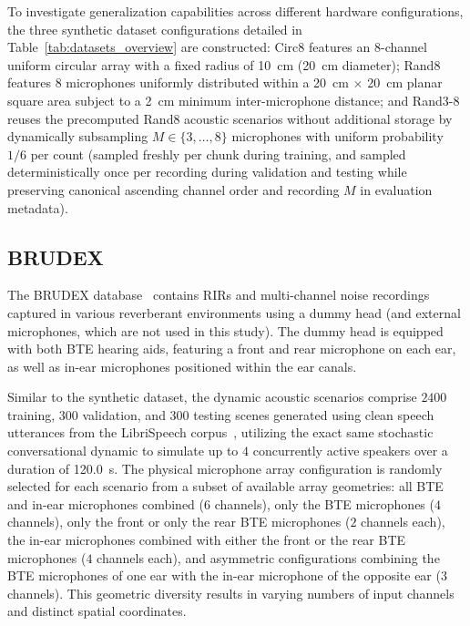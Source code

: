 \documentclass[lettersize,journal]{IEEEtran}
\begin{document}
To investigate generalization capabilities across different hardware configurations,
the three synthetic dataset configurations detailed in Table~\ref{tab:datasets_overview} are constructed:
Circ8 features an $8$-channel uniform circular array with a fixed radius of \SI{10}{\centi\meter} (\SI{20}{\centi\meter} diameter);
Rand8 features $8$ microphones uniformly distributed within a \SI{20}{\centi\meter} $\times$ \SI{20}{\centi\meter} planar square area subject to a \SI{2}{\centi\meter} minimum inter-microphone distance;
and Rand3-8 reuses the precomputed Rand8 acoustic scenarios without additional storage by dynamically subsampling $M \in \{3, \ldots, 8\}$ microphones with uniform probability $1/6$ per count (sampled freshly per chunk during training, and sampled deterministically once per recording during validation and testing while preserving canonical ascending channel order and recording $M$ in evaluation metadata).

\subsection{BRUDEX}

The \gls{BRUDEX} database~\cite{fejgin2023brudex} contains \glspl{RIR} and multi-channel noise recordings
captured in various reverberant environments using a dummy head (and external microphones, which are not used in this study).
The dummy head is equipped with both \gls{BTE} hearing aids,
featuring a front and rear microphone on each ear,
as well as in-ear microphones positioned within the ear canals.

Similar to the synthetic dataset, the dynamic acoustic scenarios comprise $2400$ training, $300$ validation, and $300$ testing scenes generated
using clean speech utterances from the LibriSpeech corpus~\cite{panayotov2015librispeech},
utilizing the exact same stochastic conversational dynamic
to simulate up to $4$ concurrently active speakers over a duration of \SI{120.0}{\second}.
The physical microphone array configuration is randomly selected for each scenario
from a subset of available array geometries:
all \gls{BTE} and in-ear microphones combined ($6$ channels),
only the \gls{BTE} microphones ($4$ channels),
only the front or only the rear \gls{BTE} microphones ($2$ channels each),
the in-ear microphones combined with either the front or the rear \gls{BTE} microphones ($4$ channels each),
and asymmetric configurations combining the \gls{BTE} microphones of one ear
with the in-ear microphone of the opposite ear ($3$ channels).
This geometric diversity results in varying numbers of input channels
and distinct spatial coordinates.
\end{document}
